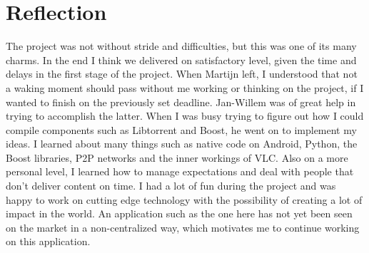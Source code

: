 \section{Reflection}
\thispagestyle{fancy}
\label{sec:rel_work}
The project was not without stride and difficulties, but this was one of its many charms. In the end I think we delivered on satisfactory level, given the time and delays in the first stage of the project. When Martijn left, I understood that not a waking moment should pass without me working or thinking on the project, if I wanted to finish on the previously set deadline. Jan-Willem was of great help in trying to accomplish the latter. When I was busy trying to figure out how I could compile components such as Libtorrent and Boost, he went on to implement my ideas. 
I learned about many things such as native code on Android, Python, the Boost libraries, P2P networks and the inner workings of VLC. Also on a more personal level, I learned how to manage expectations and deal with people that don't deliver content on time. 
I had a lot of fun during the project and was happy to work on cutting edge technology with the possibility of creating a lot of impact in the world. An application such as the one here has not yet been seen on the market in a non-centralized way, which motivates me to continue working on this application. 